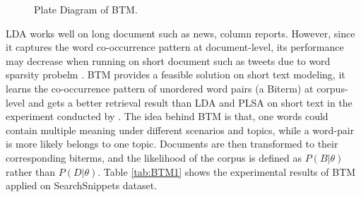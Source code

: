 \begin{figure}[!htp]
    \centering
    \caption{Plate Diagram of BTM.\cite{yan2013biterm}}
    \label{fig:btm}
\end{figure}
LDA works well on long document such as news, column reports. However, since it captures the word co-occurrence pattern at document-level, its performance may decrease when running on short document such as tweets due to word sparsity probelm \cite{yan2013biterm}. BTM provides a feasible solution on short text modeling, it learns the co-occurrence pattern of unordered word pairs (a Biterm) at corpus-level and gets a better retrieval result than LDA and PLSA on short text in the experiment conducted by \cite{yan2013biterm}. The idea behind BTM is that, one words could contain multiple meaning under different scenarios and topics, while a word-pair is more likely belongs to one topic. Documents are then transformed to their corresponding biterms, and the likelihood of the corpus is defined as $P(B|\theta)$ rather than $P(D|\theta)$. 
Table \ref{tab:BTM1} shows the experimental results of BTM applied on SearchSnippets dataset.
